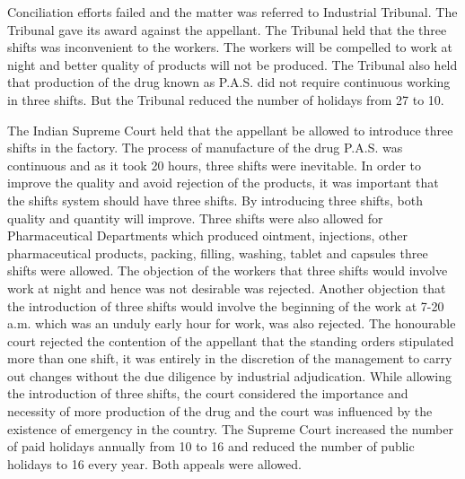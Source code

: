 \begin{multicols}{2}
\noi
Conciliation efforts failed and the matter was referred to Industrial Tribunal. The Tribunal
gave its award against the appellant. The Tribunal held that the three shifts was inconvenient
to the workers. The workers will be compelled to work at night and better quality of products
will not be produced. The Tribunal also held that production of the drug known as P.A.S. did
not require continuous working in three shifts. But the Tribunal reduced the number of
holidays from 27 to 10.

\noi
The Indian Supreme Court held that the appellant be allowed to introduce three shifts in the
factory. The process of manufacture of the drug P.A.S. was continuous and as it took 20
hours, three shifts were inevitable. In order to improve the quality and avoid rejection of the
products, it was important that the shifts system should have three shifts. By introducing three
shifts, both quality and quantity will improve. Three shifts were also allowed for
Pharmaceutical Departments which produced ointment, injections, other pharmaceutical
products, packing, filling, washing, tablet and capsules three shifts were allowed. The
objection of the workers that three shifts would involve work at night and hence was not
desirable was rejected. Another objection that the introduction of three shifts would involve
the beginning of the work at 7-20 a.m. which was an unduly early hour for work, was also
rejected. The honourable court rejected the contention of the appellant that the standing
orders stipulated more than one shift, it was entirely in the discretion of the management to
carry out changes without the due diligence by industrial adjudication. While allowing the
introduction of three shifts, the court considered the importance and necessity of more
production of the drug and the court was influenced by the existence of emergency in the
country. The Supreme Court increased the number of paid holidays annually from 10 to 16
and reduced the number of public holidays to 16 every year. Both appeals were allowed.


\end{multicols}
